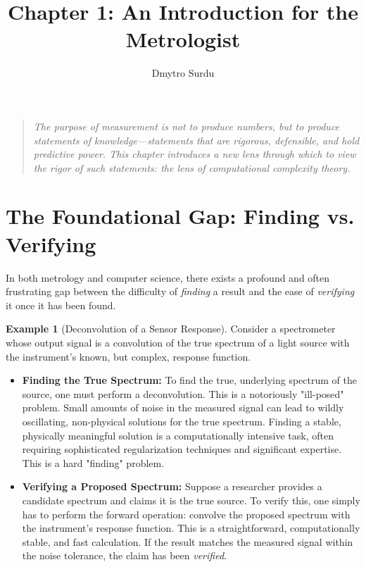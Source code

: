 \documentclass[12pt]{article}
\title{\textbf{Chapter 1: An Introduction for the Metrologist}}
\author{Dmytro Surdu}
\date{}
\theoremstyle{definition}
\newtheorem{example}{Example}[section]
\begin{document}
\maketitle

\begin{quote}
\textit{The purpose of measurement is not to produce numbers, but to produce statements of knowledge—statements that are rigorous, defensible, and hold predictive power. This chapter introduces a new lens through which to view the rigor of such statements: the lens of computational complexity theory.}
\end{quote}

\section{The Foundational Gap: Finding vs. Verifying}

In both metrology and computer science, there exists a profound and often frustrating gap between the difficulty of \emph{finding} a result and the ease of \emph{verifying} it once it has been found.

\begin{example}[Deconvolution of a Sensor Response]
Consider a spectrometer whose output signal is a convolution of the true spectrum of a light source with the instrument's known, but complex, response function.
\begin{itemize}
    \item \textbf{Finding the True Spectrum:} To find the true, underlying spectrum of the source, one must perform a deconvolution. This is a notoriously "ill-posed" problem. Small amounts of noise in the measured signal can lead to wildly oscillating, non-physical solutions for the true spectrum. Finding a stable, physically meaningful solution is a computationally intensive task, often requiring sophisticated regularization techniques and significant expertise. This is a hard "finding" problem.
    \item \textbf{Verifying a Proposed Spectrum:} Suppose a researcher provides a candidate spectrum and claims it is the true source. To verify this, one simply has to perform the forward operation: convolve the proposed spectrum with the instrument's response function. This is a straightforward, computationally stable, and fast calculation. If the result matches the measured signal within the noise tolerance, the claim has been \emph{verified}.
\end{itemize}
\end{example}
\end{document}
